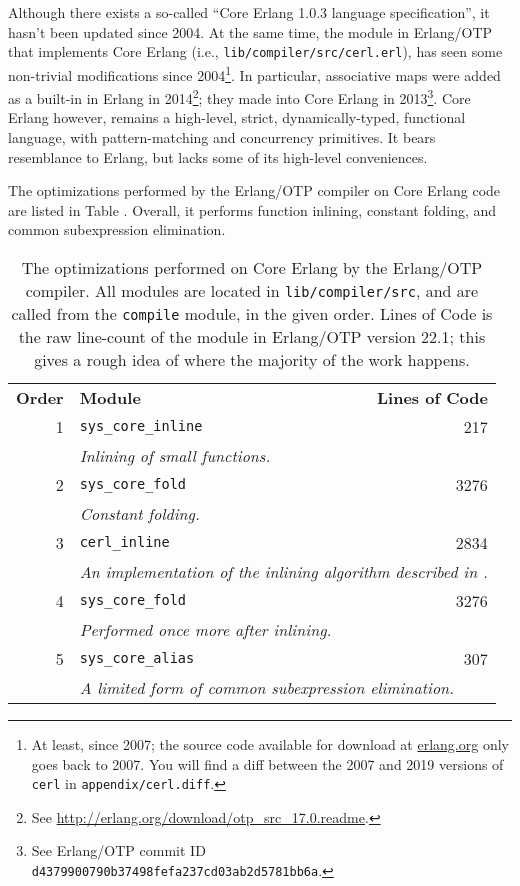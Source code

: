 Although there exists a so-called ``Core Erlang 1.0.3 language
specification''\cite{erlang:2004:core-spec}, it hasn't been updated
since 2004. At the same time, the module in Erlang/OTP that implements
Core Erlang (i.e., \texttt{lib/compiler/src/cerl.erl}), has seen some
non-trivial modifications since 2004\footnote{At least, since 2007;
the source code available for download at \url{erlang.org} only goes
back to 2007. You will find a diff between the 2007 and 2019 versions
of \texttt{cerl} in \texttt{appendix/cerl.diff}.}. In particular,
associative maps were added as a built-in in Erlang in
2014\footnote{See
\url{http://erlang.org/download/otp_src_17.0.readme}.}; they made into
Core Erlang in 2013\footnote{See Erlang/OTP commit ID
\texttt{d4379900790b37498fefa237cd03ab2d5781bb6a}.}. Core Erlang
however, remains a high-level, strict, dynamically-typed, functional
language, with pattern-matching and concurrency primitives.  It bears
resemblance to Erlang, but lacks some of its high-level conveniences.

The optimizations performed by the Erlang/OTP compiler on Core Erlang
code are listed in Table .
Overall, it performs function inlining, constant folding, and common
subexpression elimination.

\begin{table}[ht!]
\centering
\def\arraystretch{1.2}
\begin{tabular}{rlr}
\textbf{Order} & \textbf{Module} & \textbf{Lines of Code} \\\cline{2-3}
1 & \texttt{sys\_core\_inline} & 217 \\
  & \multicolumn{2}{l}{\quad\emph{%
      Inlining of small functions.%
    }} \\\cline{2-3}
2 & \texttt{sys\_core\_fold} & 3276 \\
  & \multicolumn{2}{l}{\quad\emph{%
      Constant folding.%
    }} \\\cline{2-3}
3 & \texttt{cerl\_inline} & 2834 \\
  & \multicolumn{2}{l}{\quad\emph{%
      An implementation of the inlining algorithm described in%
      \cite{erlang:sas:1997:inlining}.%
    }} \\\cline{2-3}
4 & \texttt{sys\_core\_fold} & 3276 \\
  & \multicolumn{2}{l}{\quad\emph{%
      Performed once more after inlining.%
    }} \\\cline{2-3}
5 & \texttt{sys\_core\_alias} & 307 \\
  & \multicolumn{2}{l}{\quad\emph{%
      A limited form of common subexpression elimination.%
    }} \\\cline{2-3}
\end{tabular}
\caption{The optimizations performed on Core Erlang by the Erlang/OTP
compiler. All modules are located in \texttt{lib/compiler/src}, and
are called from the \texttt{compile} module, in the given order. Lines
of Code is the raw line-count of the module in Erlang/OTP version
22.1; this gives  a rough idea of where the majority of the work
happens.}
\label{tbl:core-erlang-optimizations}
\end{table}

